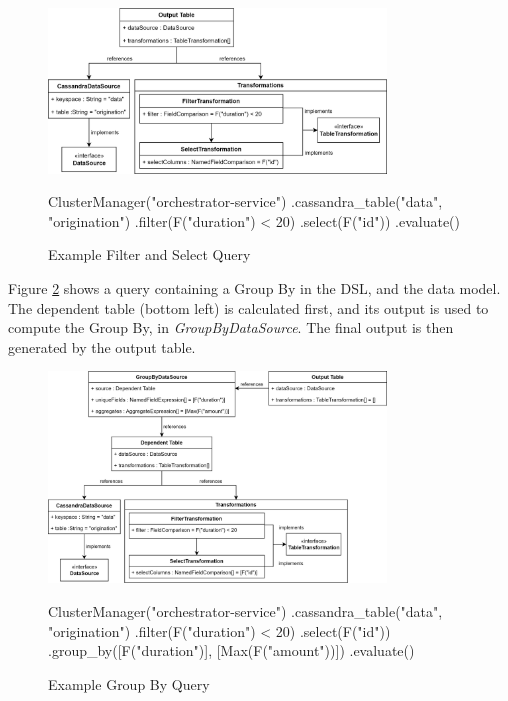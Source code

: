 \begin{figure}[htp]
	\centering
	\includegraphics[width=0.8\textwidth]{chapters/diagrams/implementation/filter-select-query}
	\begin{python}
ClusterManager("orchestrator-service")
.cassandra_table("data", "origination")
.filter(F("duration") < 20)
.select(F("id"))
.evaluate()
	\end{python}
	\caption{Example Filter and Select Query}
	\label{fig:filter-select-query}
\end{figure}


Figure \ref{fig:group-by-query} shows a query containing a Group By in the DSL, and the data model. The dependent table (bottom left) is calculated first, and its output is used to compute the Group By, in \textit{GroupByDataSource}. The final output is then generated by the output table.

\begin{figure}[htp]
	\centering
	\includegraphics[width=0.8\textwidth]{chapters/diagrams/implementation/group-by-query}
	\linebreak
	\begin{python}
ClusterManager("orchestrator-service")
.cassandra_table("data", "origination")
.filter(F("duration") < 20)
.select(F("id"))
.group_by([F("duration")], [Max(F("amount"))])
.evaluate()
	\end{python}
	\caption{Example Group By Query}
	\label{fig:group-by-query}
\end{figure}

